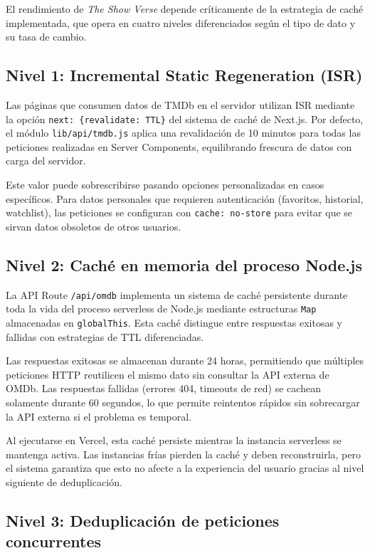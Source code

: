 El rendimiento de \textit{The Show Verse} depende críticamente de la estrategia de caché implementada, que opera en cuatro niveles diferenciados según el tipo de dato y su tasa de cambio.

\subsection{Nivel 1: Incremental Static Regeneration (ISR)}

Las páginas que consumen datos de TMDb en el servidor utilizan ISR mediante la opción \texttt{next: \{revalidate: TTL\}} del sistema de caché de Next.js. Por defecto, el módulo \texttt{lib/api/tmdb.js} aplica una revalidación de 10 minutos para todas las peticiones realizadas en Server Components, equilibrando frescura de datos con carga del servidor.

Este valor puede sobrescribirse pasando opciones personalizadas en casos específicos. Para datos personales que requieren autenticación (favoritos, historial, watchlist), las peticiones se configuran con \texttt{cache: no-store} para evitar que se sirvan datos obsoletos de otros usuarios.

\subsection{Nivel 2: Caché en memoria del proceso Node.js}

La API Route \texttt{/api/omdb} implementa un sistema de caché persistente durante toda la vida del proceso serverless de Node.js mediante estructuras \texttt{Map} almacenadas en \texttt{globalThis}. Esta caché distingue entre respuestas exitosas y fallidas con estrategias de TTL diferenciadas.

Las respuestas exitosas se almacenan durante 24 horas, permitiendo que múltiples peticiones HTTP reutilicen el mismo dato sin consultar la API externa de OMDb. Las respuestas fallidas (errores 404, timeouts de red) se cachean solamente durante 60 segundos, lo que permite reintentos rápidos sin sobrecargar la API externa si el problema es temporal.

Al ejecutarse en Vercel, esta caché persiste mientras la instancia serverless se mantenga activa. Las instancias frías pierden la caché y deben reconstruirla, pero el sistema garantiza que esto no afecte a la experiencia del usuario gracias al nivel siguiente de deduplicación.

\subsection{Nivel 3: Deduplicación de peticiones concurrentes}


